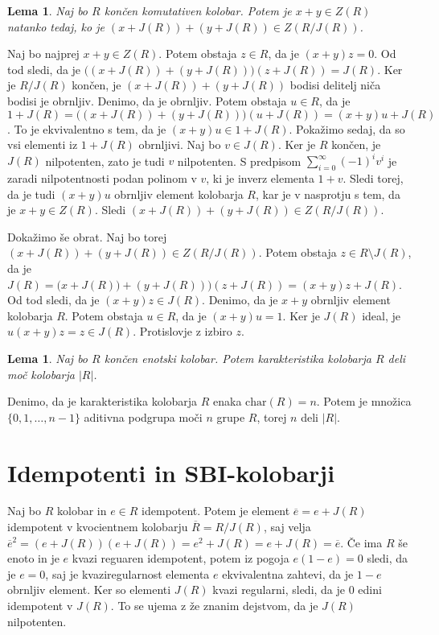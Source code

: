 \documentclass[a4paper, 12pt]{amsart}
\theoremstyle{definition} %
\theoremstyle{plain} %
\newtheorem{lema}[definicija]{Lema}
\begin{document}
\begin{lema}
\label{vsotaElementovDeliteljNica}
Naj bo $R$ končen komutativen kolobar. Potem je $x+y \in Z(R)$ natanko tedaj, ko je $(x+ J(R)) + (y+J(R)) \in Z(R/J(R))$.
\end{lema}

\proof
Naj bo najprej $x+y\in Z(R)$. Potem obstaja $z\in R$, da je $(x+y)z = 0$. Od tod sledi, da je $\big( ( x + J(R)) + (y+J(R))\big) (z+J(R)) = J(R)$. Ker je $R/J(R)$ končen, je  $( x + J(R)) + (y+J(R))$ bodisi delitelj niča bodisi je obrnljiv. Denimo, da je obrnljiv. Potem obstaja $u\in R$, da je $1+J(R) = \big( (x+J(R)) + (y+J(R)) \big) (u+J(R)) = (x+y)u + J(R)$. To je ekvivalentno s tem, da je $(x+y)u \in 1 + J(R)$. Pokažimo sedaj, da so vsi elementi iz $1+J(R)$ obrnljivi. Naj bo $v\in J(R)$. Ker je $R$ končen, je $J(R)$ nilpotenten, zato je tudi $v$ nilpotenten. S predpisom $\sum_{i=0}^{\infty} (-1)^i v^i$ je zaradi nilpotentnosti podan polinom v $v$, ki je inverz elementa $1+v$. Sledi torej, da je tudi $(x+y)u$ obrnljiv element kolobarja $R$, kar je v nasprotju s tem, da je $x+y\in Z(R)$. Sledi $( x + J(R)) + (y+J(R)) \in Z(R/J(R))$.

Dokažimo še obrat. Naj bo torej $( x + J(R)) + (y+J(R)) \in Z(R/J(R))$. Potem obstaja $z\in R\setminus J(R)$, da je $J(R) = \big ( x + J(R)) + (y+J(R)) \big) (z+J(R)) = (x+y)z +J(R)$. Od tod sledi, da je $(x+y)z\in J(R)$. Denimo, da je $x+y$ obrnljiv element kolobarja $R$. Potem obstaja $u\in R$, da je $(x+y)u = 1$. Ker je $J(R)$ ideal, je $u(x+y) z = z\in J(R)$. Protislovje z izbiro $z$.
\endproof

\begin{lema}
\label{charDeliMocKolobarja}
Naj bo $R$ končen enotski kolobar. Potem karakteristika kolobarja $R$ deli moč kolobarja $|R|$.
\end{lema}

\proof
Denimo, da je karakteristika kolobarja $R$ enaka $\textrm{char}(R) = n$. Potem je množica $\{0,1,\dots,n-1\}$ aditivna podgrupa moči $n$ grupe $R$, torej $n$ deli $|R|$.
\endproof

\section{Idempotenti in SBI-kolobarji}

Naj bo $R$ kolobar in $e\in R$ idempotent. Potem je element $\overline{e} = e + J(R)$ idempotent v kvocientnem kolobarju $\overline{R}=R/J(R)$, saj velja $\overline{e}^2 = (e+J(R)) (e+J(R)) = e^2 + J(R) = e+J(R) = \overline{e}$. Če ima $R$ še enoto in je $e$ kvazi reguaren idempotent, potem iz pogoja $e(1-e) = 0$ sledi, da je $e=0$, saj je kvaziregularnost elementa $e$ ekvivalentna zahtevi, da je $1-e$ obrnljiv element. Ker so elementi $J(R)$ kvazi regularni, sledi, da je $0$ edini idempotent v $J(R)$. To se ujema z že znanim dejstvom, da je $J(R)$ nilpotenten. 
\end{document}
